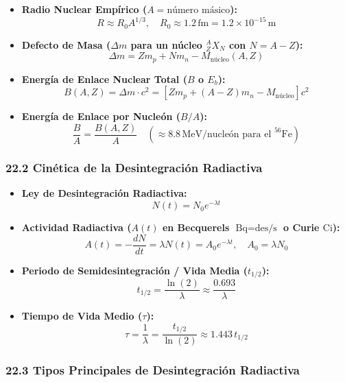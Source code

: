 \documentclass[11pt,a4paper]{article}
\begin{document}
\begin{itemize}
  \item \textbf{Radio Nuclear Empírico ($A = \text{número másico}$):}
  \[
    R \approx R_0 A^{1/3}, \quad R_0 \approx 1.2 \, \text{fm} = 1.2 \times 10^{-15} \, \text{m}
  \]
  \item \textbf{Defecto de Masa ($\Delta m$ para un núcleo $_Z^A X_N$ con $N = A - Z$):}
  \[
    \Delta m = Z m_p + N m_n - M_{\text{núcleo}}(A, Z)
  \]
  \item \textbf{Energía de Enlace Nuclear Total ($B$ o $E_b$):}
  \[
    B(A, Z) = \Delta m \cdot c^2 = [Z m_p + (A - Z) m_n - M_{\text{núcleo}}] c^2
  \]
  \item \textbf{Energía de Enlace por Nucleón ($B/A$):}
  \[
    \frac{B}{A} = \frac{B(A, Z)}{A} \quad (\approx 8.8 \, \text{MeV/nucleón para el } ^{56}\text{Fe})
  \]
\end{itemize}

\subsubsection*{22.2 Cinética de la Desintegración Radiactiva}

\begin{itemize}
  \item \textbf{Ley de Desintegración Radiactiva:}
  \[
    N(t) = N_0 e^{-\lambda t}
  \]
  \item \textbf{Actividad Radiactiva ($A(t)$ en Becquerels $\text{Bq} = \text{des/s}$ o Curie $\text{Ci}$):}
  \[
    A(t) = -\frac{dN}{dt} = \lambda N(t) = A_0 e^{-\lambda t}, \quad A_0 = \lambda N_0
  \]
  \item \textbf{Periodo de Semidesintegración / Vida Media ($t_{1/2}$):}
  \[
    t_{1/2} = \frac{\ln(2)}{\lambda} \approx \frac{0.693}{\lambda}
  \]
  \item \textbf{Tiempo de Vida Medio ($\tau$):}
  \[
    \tau = \frac{1}{\lambda} = \frac{t_{1/2}}{\ln(2)} \approx 1.443 \, t_{1/2}
  \]
\end{itemize}

\subsubsection*{22.3 Tipos Principales de Desintegración Radiactiva}
\end{document}
